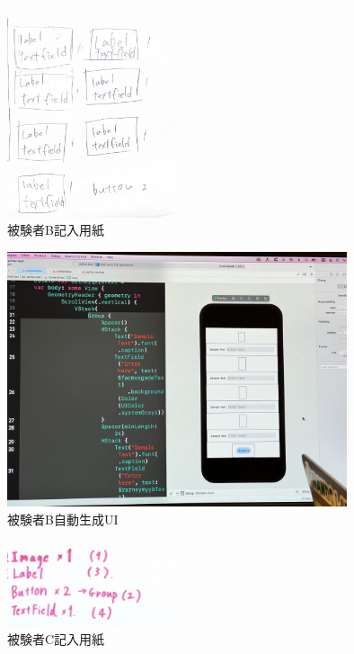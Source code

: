 \begin{figure}[htbp]
  \begin{minipage}{\hsize}
    \begin{center}
       \includegraphics[width=50mm]{img/usertest_viewstructure_2.png}
    \end{center}
    \caption{被験者B記入用紙}
    \label{fig:usertest_viewstructure_2}
  \end{minipage}
\end{figure}

\begin{figure}[htbp]
  \begin{minipage}{\hsize}
    \begin{center}
       \includegraphics[width=100mm]{img/usertest_autogen_2.jpeg}
    \end{center}
    \caption{被験者B自動生成UI}
    \label{fig:usertest_autogen_2}
  \end{minipage}
\end{figure}


\begin{figure}[htbp]
  \begin{minipage}{\hsize}
    \begin{center}
       \includegraphics[width=50mm]{img/usertest_viewstructure_3.png}
    \end{center}
    \caption{被験者C記入用紙}
    \label{fig:usertest_viewstructure_3}
  \end{minipage}
\end{figure}


